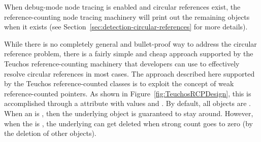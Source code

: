 \documentclass[pdf,ps2pdf,11pt]{SANDreport}
\begin{document}
When debug-mode node tracing is enabled and circular references exist,
the reference-counting node tracing machinery will print out the
remaining {} objects when it exists (see
Section~\ref{sec:detection-circular-references} for more details).

While there is no completely general and bullet-proof way to address
the circular reference problem, there is a fairly simple and cheap
approach supported by the Teuchos reference-counting machinery that
developers can use to effectively resolve circular references in most
cases.  The approach described here supported by the Teuchos
reference-counted classes is to exploit the concept of weak
reference-counted pointers.  As shown in
Figure~\ref{fig:TeuchosRCPDesign}, this is accomplished through a
{} attribute with values {} and
{}.  By default, all {} objects are {}.
When an {} is {}, then the underlying
{} object is guaranteed to stay around.  However, when
the {} is {}, the underlying {} can
get deleted when strong count goes to zero (by the deletion of other
{} {} objects).
\end{document}
